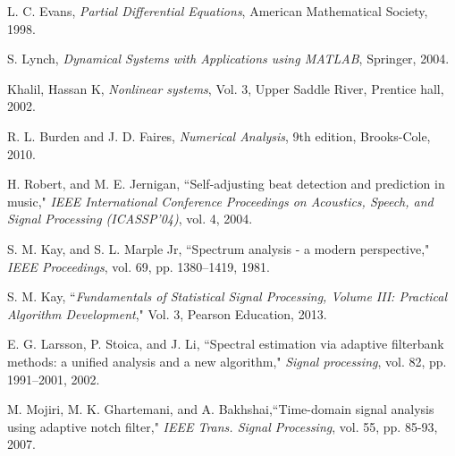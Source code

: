 \documentclass{UCF_ETD}
\begin{document}
\begin{thebibliography}{99}
L. C. Evans,  \emph{Partial Differential Equations}, American Mathematical Society, 1998.

S. Lynch,  \emph{Dynamical Systems with Applications using MATLAB}, Springer, 2004.

Khalil, Hassan K, \emph{Nonlinear systems}, Vol. 3, Upper Saddle River, Prentice hall, 2002.

R. L. Burden and J. D. Faires, \emph{Numerical Analysis}, 9th edition, Brooks-Cole, 2010.

%

H. Robert, and M. E. Jernigan, ``Self-adjusting beat detection and prediction in music,"
\emph{IEEE International Conference Proceedings on Acoustics, Speech, and Signal Processing (ICASSP'04)}, vol. 4, 2004.

S. M. Kay, and S. L. Marple Jr, ``Spectrum analysis - a modern perspective," \emph{IEEE Proceedings}, vol. 69, pp. 1380--1419, 1981.

S. M. Kay, ``\emph{Fundamentals of Statistical Signal Processing, Volume III: Practical Algorithm Development}," Vol. 3, Pearson Education, 2013.

E. G. Larsson, P. Stoica, and J. Li, ``Spectral estimation via adaptive filterbank methods: a unified analysis and a new algorithm," \emph{Signal processing}, vol. 82, pp. 1991--2001, 2002.


M. Mojiri, M. K. Ghartemani, and A. Bakhshai,``Time-domain signal analysis using adaptive notch filter,"  \emph{IEEE Trans. Signal Processing}, vol. 55, pp. 85-93,  2007.





\end{thebibliography}
\end{document}
